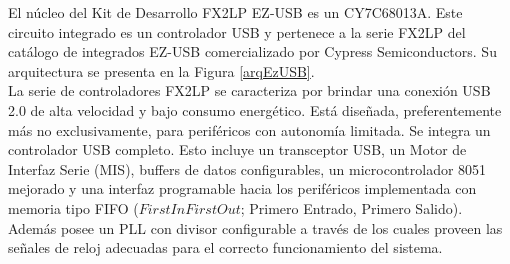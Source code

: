 El núcleo del Kit de Desarrollo FX2LP EZ-USB es un CY7C68013A. Este circuito integrado es un controlador USB y pertenece a la serie FX2LP del catálogo de integrados EZ-USB comercializado por Cypress Semiconductors. Su arquitectura se presenta en la Figura \ref{arqEzUSB}. \\

La serie de controladores FX2LP se caracteriza por brindar una conexión USB 2.0 de alta velocidad y bajo consumo energético. Está diseñada, preferentemente más no exclusivamente, para periféricos con autonomía limitada. Se integra un controlador USB completo. Esto incluye un transceptor USB, un Motor de Interfaz Serie (MIS), buffers de datos configurables, un microcontrolador 8051 mejorado y una interfaz programable hacia los periféricos implementada con memoria tipo FIFO (\(First In First Out\); Primero Entrado, Primero Salido). Además posee un PLL con divisor configurable a través de los cuales proveen las señales de reloj adecuadas para el correcto funcionamiento del sistema.\\

